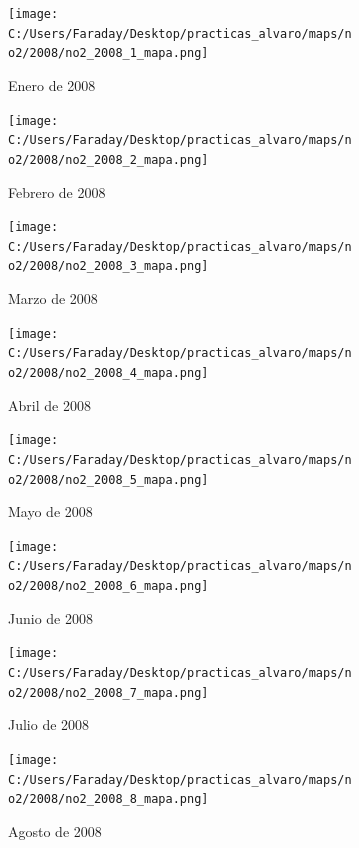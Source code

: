 \documentclass[12pt]{article}
\begin{document}
\begin{figure}[H]
\centering
\begin{subfigure}[h]{0.45\textwidth}
\texttt{[image: C:/Users/Faraday/Desktop/practicas\_alvaro/maps/no2/2008/no2\_2008\_1\_mapa.png]}
\caption{Enero de 2008}
\label{fig:map-mon-1-1-2008}
\end{subfigure}
%
\begin{subfigure}[H]{0.45\textwidth}
\texttt{[image: C:/Users/Faraday/Desktop/practicas\_alvaro/maps/no2/2008/no2\_2008\_2\_mapa.png]}
\caption{Febrero de 2008}
\label{fig:map-mon-1-2-2008}
\end{subfigure}
\caption{}
\end{figure}

\begin{figure}[H]
\centering
\begin{subfigure}[h]{0.45\textwidth}
\texttt{[image: C:/Users/Faraday/Desktop/practicas\_alvaro/maps/no2/2008/no2\_2008\_3\_mapa.png]}
\caption{Marzo de 2008}
\label{fig:map-mon-1-3-2008}
\end{subfigure}
%
\begin{subfigure}[H]{0.45\textwidth}
\texttt{[image: C:/Users/Faraday/Desktop/practicas\_alvaro/maps/no2/2008/no2\_2008\_4\_mapa.png]}
\caption{Abril de 2008}
\label{fig:map-mon-1-4-2008}
\end{subfigure}
\caption{}
\end{figure}

\newpage

\begin{figure}[H]
\centering
\begin{subfigure}[h]{0.45\textwidth}
\texttt{[image: C:/Users/Faraday/Desktop/practicas\_alvaro/maps/no2/2008/no2\_2008\_5\_mapa.png]}
\caption{Mayo de 2008}
\label{fig:map-mon-1-5-2008}
\end{subfigure}
%
\begin{subfigure}[H]{0.45\textwidth}
\texttt{[image: C:/Users/Faraday/Desktop/practicas\_alvaro/maps/no2/2008/no2\_2008\_6\_mapa.png]}
\caption{Junio de 2008}
\label{fig:map-mon-1-6-2008}
\end{subfigure}
\caption{}
\end{figure}

\begin{figure}[H]
\centering
\begin{subfigure}[h]{0.45\textwidth}
\texttt{[image: C:/Users/Faraday/Desktop/practicas\_alvaro/maps/no2/2008/no2\_2008\_7\_mapa.png]}
\caption{Julio de 2008}
\label{fig:map-mon-1-7-2008}
\end{subfigure}
%
\begin{subfigure}[H]{0.45\textwidth}
\texttt{[image: C:/Users/Faraday/Desktop/practicas\_alvaro/maps/no2/2008/no2\_2008\_8\_mapa.png]}
\caption{Agosto de 2008}
\label{fig:map-mon-1-8-2008}
\end{subfigure}
\caption{}
\end{figure}
\end{document}
